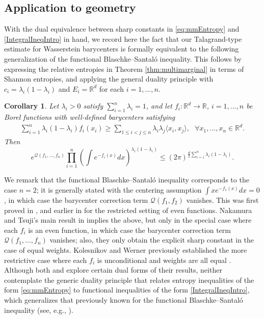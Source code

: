 \documentclass[10pt]{article}
\newtheorem{corollary}[theorem]{Corollary}
\begin{document}
 

\subsection{Application to geometry}
With the dual equivalence between sharp constants in \eqref{eq:mmEntropy} and \eqref{IntegralIneqIntro} in hand, we record here the fact that our Talagrand-type estimate for Wasserstein barycenters is formally equivalent to the following generalization of the functional  Blaschke--Santal\'{o}  inequality. This follows by expressing the relative entropies in Theorem \ref{thm:multimarginal} in terms of Shannon entropies, and applying the general duality principle   with $c_i = \lambda_i(1-\lambda_i)$ and $E_i = \mathbb{R}^d$ for each $i=1,\dots,n$.
\begin{corollary}\label{cor:FnlBS}
Let $\lambda_i >  0$ satisfy $\sum_{i=1}^n \lambda_i = 1$, and let $f_i : \mathbb{R}^d \to \mathbb{R}$, $i=1, \dots, n$ be Borel functions with well-defined barycenters satisfying
\begin{align}
\sum_{i=1}^n \lambda_i (1-\lambda_i) f_i(x_i) \geq \sum_{1\leq i < j \leq n} \lambda_i \lambda_j \langle x_i, x_j \rangle, ~~~\forall x_1, \dots, x_n \in \mathbb{R}^d .\label{ptwiseInequality}
\end{align}
Then 
$$
e^{\mathcal{Q}(f_1, \dots, f_n)}\prod_{i=1}^n \left( \int e^{-f_i(x)}dx \right)^{\lambda_i (1-\lambda_i)} \leq (2\pi)^{\frac{d}{2} \sum_{i=1}^n \lambda_i (1-\lambda_i)}.
$$
\end{corollary}


We remark that the functional  Blaschke--Santal\'{o}  inequality  corresponds to the case $n=2$; it is  generally stated with the centering assumption $\int x e^{-f_1(x)}  dx=0$, in which case the barycenter correction term $\mathcal{Q}(f_1, f_2)$ vanishes. This was first proved in \cite{AKM}, and earlier in \cite{Ball} for the restricted setting of even functions.  Nakamura and Tsuji's main result in \cite{NT} implies the above, but only in the special case where each $f_i$ is an even function, in which case the barycenter correction term $\mathcal{Q}(f_1, \dots, f_n)$ vanishes; also, they only obtain the explicit  sharp constant in the case of equal weights.   Kolesnikov and Werner previously established  the more restrictive case where each $f_i$ is unconditional and weights are all equal \cite{KW}.   Although both \cite{NT} and \cite{KW} explore certain dual forms of their results, neither contemplate the generic duality principle that relates entropy inequalities of the form \eqref{eq:mmEntropy} to functional inequalities of the form \eqref{IntegralIneqIntro}, which generalizes that previously known for the functional Blaschke--Santal\'o inequality (see, e.g., \cite{MF}).
\end{document}
